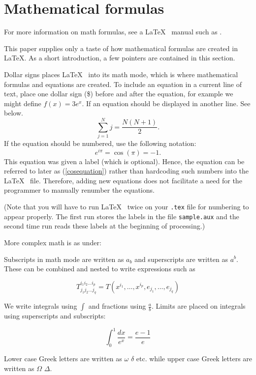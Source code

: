 \section{Mathematical formulas}

For more information on math formulas, see a \LaTeX~ manual such as \cite{go-mi-sa:latex}.  

This paper supplies only a taste of how mathematical formulas are created in \LaTeX.  As a short introduction, a few pointers are contained in this section. 

Dollar signs places \LaTeX~ into its math mode, which is where mathematical formulas and equations are created.  To include an equation in a current line of text, place one dollar sign (\$) before 
and after the equation, for example we might define $f(x) = 3e^x$.   If an equation should be displayed in another line. See below.
\[ \sum_{j=1}^N j = \frac{N(N+1)}{2}. \]
If the equation should be numbered, use the following notation:
\begin{equation}  
e^{i\pi} = \cos(\pi) = -1.
\label{cosequation}
\end{equation}
This equation was given a label (which is optional).  Hence, the equation can be referred to later as (\ref{cosequation}) rather than hardcoding such numbers into the \LaTeX~ file.  Therefore, adding new equations does not facilitate a need for the programmer to manually renumber the equations. 

(Note that you will have to run \LaTeX~ twice on your {\tt .tex}
file for numbering to appear properly.  The first run stores the labels in the file {\tt sample.aux} and the second time run reads these labels at the beginning of processing.)


More complex math is as under:

Subscripts in math mode are written as $a_b$ and superscripts are written as $a^b$. These can be combined and nested to write expressions such as

\[ T^{i_1 i_2 \dots i_p}_{j_1 j_2 \dots j_q} = T(x^{i_1},\dots,x^{i_p},e_{j_1},\dots,e_{j_q}) \]
 
We write integrals using $\int$ and fractions using $\frac{a}{b}$. Limits are placed on integrals using superscripts and subscripts:

\[ \int_0^1 \frac{dx}{e^x} =  \frac{e-1}{e} \]

Lower case Greek letters are written as $\omega$ $\delta$ etc. while upper case Greek letters are written as $\Omega$ $\Delta$.


